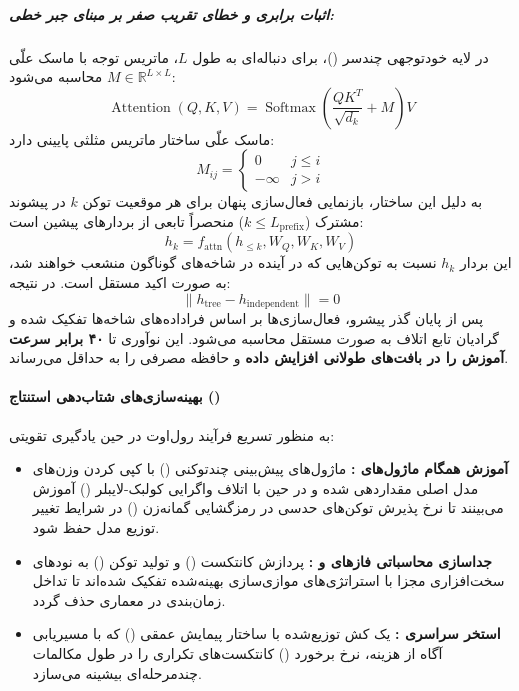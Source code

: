 \subparagraph*{اثبات برابری و خطای تقریب صفر بر مبنای جبر خطی:}
در لایه خودتوجهی چندسر ()، برای دنباله‌ای به طول $L$، ماتریس توجه با ماسک علّی $M \in \mathbb{R}^{L \times L}$ محاسبه می‌شود:
\begin{equation}
    \operatorname{Attention}(Q, K, V) = \operatorname{Softmax}\left( \frac{Q K^T}{\sqrt{d_k}} + M \right) V
\end{equation}
ماسک علّی ساختار ماتریس مثلثی پایینی دارد:
\begin{equation}
    M_{ij} = \begin{cases} 
        0 & j \le i \\ 
        -\infty & j > i 
    \end{cases}
\end{equation}
به دلیل این ساختار، بازنمایی فعال‌سازی پنهان برای هر موقعیت توکن $k$ در پیشوند مشترک ($k \le L_{\text{prefix}}$) منحصراً تابعی از بردارهای پیشین است:
\begin{equation}
    h_k = f_{\text{attn}}\left(h_{\le k}, W_Q, W_K, W_V\right)
\end{equation}
این بردار $h_k$ نسبت به توکن‌هایی که در آینده در شاخه‌های گوناگون منشعب خواهند شد، به صورت اکید مستقل است. در نتیجه:
\begin{equation}
    \|h_{\text{tree}} - h_{\text{independent}}\| = 0
\end{equation}
پس از پایان گذر پیشرو، فعال‌سازی‌ها بر اساس فراداده‌های شاخه‌ها تفکیک شده و گرادیان تابع اتلاف به صورت مستقل محاسبه می‌شود. این نوآوری تا \textbf{۴۰ برابر سرعت آموزش را در بافت‌های طولانی افزایش داده} و حافظه مصرفی را به حداقل می‌رساند.

\paragraph*{بهینه‌سازی‌های شتاب‌دهی استنتاج ()}
به منظور تسریع فرآیند رول‌اوت در حین یادگیری تقویتی:
\begin{itemize}
    \item \textbf{آموزش همگام ماژول‌های :} ماژول‌های پیش‌بینی چندتوکنی () \cite{gloeckle2024better} با کپی کردن وزن‌های مدل اصلی مقداردهی شده و در حین  با اتلاف واگرایی کولبک-لایبلر () آموزش می‌بینند تا نرخ پذیرش توکن‌های حدسی در رمزگشایی گمانه‌زن () \cite{leviathan2023fast} در شرایط تغییر توزیع مدل حفظ شود.
    \item \textbf{جداسازی محاسباتی فازهای  و :} پردازش کانتکست () و تولید توکن () به نودهای سخت‌افزاری مجزا با استراتژی‌های موازی‌سازی بهینه‌شده تفکیک شده‌اند تا تداخل زمان‌بندی در معماری  حذف گردد.
    \item \textbf{استخر سراسری :} یک کش توزیع‌شده با ساختار پیمایش عمقی () که با مسیریابی آگاه از هزینه، نرخ برخورد () کانتکست‌های تکراری را در طول مکالمات چندمرحله‌ای بیشینه می‌سازد.
\end{itemize}

